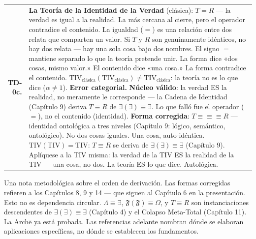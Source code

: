 \documentclass[10pt, openany, oneside]{book}
\renewcommand{\footnotesize}{\fontsize{8.5}{11}\selectfont}
\begin{document}
{\footnotesize
\noindent\begin{tabular}{r p{}}
\textbf{TD-0c.} & \textbf{La Teoría de la Identidad de la Verdad} (clásica): $T = R$ --- la verdad es igual a la realidad. La más cercana al cierre, pero el operador contradice el contenido. La igualdad ($=$) es una relación entre dos relata que comparten un valor. Si $T$ y $R$ son genuinamente idénticos, no hay dos relata --- hay una sola cosa bajo dos nombres. El signo $=$ mantiene separado lo que la teoría pretende unir. La forma dice «dos cosas, mismo valor.» El contenido dice «una cosa.» La forma contradice el contenido. $\text{TIV}_{\text{clásica}}(\text{TIV}_{\text{clásica}}) \neq \text{TIV}_{\text{clásica}}$: la teoría no es lo que dice ($\alpha \neq 1$). \textbf{Error categorial.} \textbf{Núcleo válido}: la verdad ES la realidad, no meramente le corresponde --- la Cadena de Identidad (Capítulo 9) deriva $T \equiv R$ de $\exists(\exists) \equiv \exists$. Lo que falló fue el operador ($=$), no el contenido (identidad). \textbf{Forma corregida}: $T \equiv\!\equiv\!\equiv R$ --- identidad ontológica a tres niveles (Capítulo 9: lógico, semántico, ontológico). No dos cosas iguales. Una cosa, auto-idéntica. $\text{TIV}(\text{TIV}) = \text{TIV}$: $T \equiv R$ se deriva de $\exists(\exists) \equiv \exists$ (Capítulo 9). Aplíquese a la TIV misma: la verdad de la TIV ES la realidad de la TIV --- una cosa, no dos. La teoría ES lo que dice. Autológica. \\[0.3em]
\end{tabular}
}

\vspace{0.8em}

\noindent Una nota metodológica sobre el orden de derivación. Las formas corregidas refieren a los Capítulos 8, 9 y 14 --- que siguen al Capítulo 6 en la presentación. Esto no es dependencia circular. $\Lambda \equiv \exists$, $\mathfrak{F}(\mathfrak{F}) \equiv \Omega$, y $T \equiv R$ son instanciaciones descendentes de $\exists(\exists) \equiv \exists$ (Capítulo 4) y el Colapso Meta-Total (Capítulo 11). La Arch\={e} ya está probada. Las referencias adelante nombran dónde se elaboran aplicaciones específicas, no dónde se establecen los fundamentos.

\newpage
\end{document}
